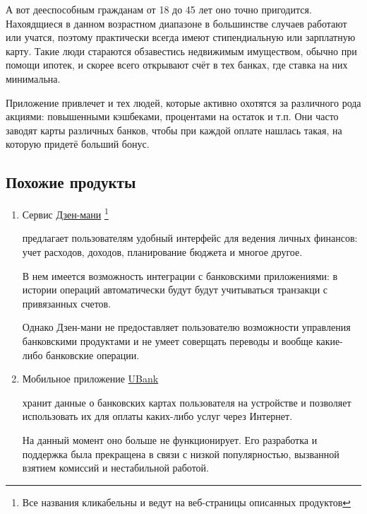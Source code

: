 \documentclass[a4paper,12pt]{article}
\begin{document}
    А вот дееспособным гражданам от 18 до 45 лет
    оно точно пригодится. Нахоядщиеся в данном возрастном
    диапазоне в большинстве случаев работают или учатся,
    поэтому практически всегда имеют стипендиальную
    или зарплатную карту. Такие люди стараются обзавестись
    недвижимым имуществом, обычно при помощи ипотек, и скорее всего открывают счёт в тех банках, где ставка на них минимальна.   

    Приложение привлечет и тех людей, которые активно охотятся
    за различного рода акциями: повышенными кэшбеками, процентами на остаток и т.п.
    Они часто заводят карты различных
    банков, чтобы при каждой оплате нашлась такая, на которую придетё
    больший бонус.

    \subsection{Похожие продукты}

    \begin{enumerate}
        \item {
            Сервис \href{zenmoney.ru}{Дзен-мани}
            \footnote{
                Все названия кликабельны и ведут на веб-страницы описанных продуктов
            }   

            предлагает пользователям удобный интерфейс 
            для ведения личных финансов: учет расходов, доходов,
            планирование бюджета и многое другое.

            В нем имеется возможность интеграции с банковскими
            приложениями: в истории операций автоматически будут
            будут учитываться транзакци с привязанных счетов.

            Однако Дзен-мани не предоставляет пользователю
            возможности управления банковскими продуктами и 
            не умеет соверщать переводы и вообще какие-либо
            банковские операции.

        }
        \item {
            Мобильное приложение \href{https://vk.com/ubank}{UBank}

            хранит данные о банковских
            картах пользователя на устройстве и позволяет использовать их
            для оплаты каких-либо услуг через Интернет.

            На данный момент оно больше не функционирует. Его разработка и поддержка
            была прекращена в связи с низкой популярностью, вызванной
            взятием комиссий и нестабильной работой.
        }
    \end{enumerate}
\end{document}
